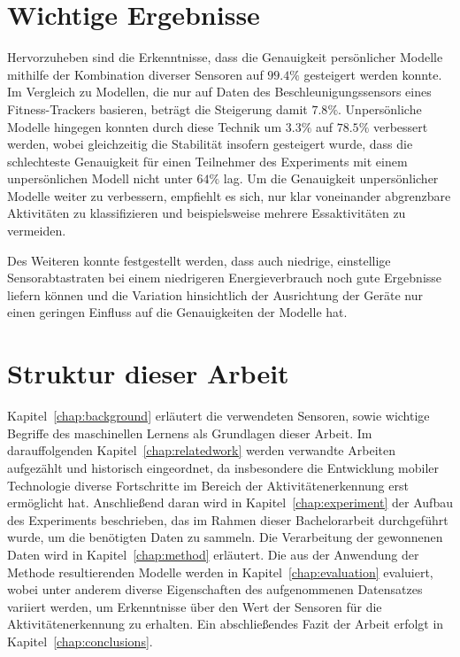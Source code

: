 \section{Wichtige Ergebnisse}
Hervorzuheben sind die Erkenntnisse, dass die Genauigkeit persönlicher Modelle mithilfe der Kombination diverser Sensoren auf $99.4 \%$ gesteigert werden konnte. Im Vergleich zu Modellen, die nur auf Daten des Beschleunigungssensors eines Fitness-Trackers basieren, beträgt die Steigerung damit $7.8 \%$. Unpersönliche Modelle hingegen konnten durch diese Technik um $3.3 \%$ auf $78.5 \%$ verbessert werden, wobei gleichzeitig die Stabilität insofern gesteigert wurde, dass die schlechteste Genauigkeit für einen Teilnehmer des Experiments mit einem unpersönlichen Modell nicht unter $64 \%$ lag. Um die Genauigkeit unpersönlicher Modelle weiter zu verbessern, empfiehlt es sich, nur klar voneinander abgrenzbare Aktivitäten zu klassifizieren und beispielsweise mehrere Essaktivitäten zu vermeiden.

Des Weiteren konnte festgestellt werden, dass auch niedrige, einstellige Sensorabtastraten bei einem niedrigeren Energieverbrauch noch gute Ergebnisse liefern können und die Variation hinsichtlich der Ausrichtung der Geräte nur einen geringen Einfluss auf die Genauigkeiten der Modelle hat.

\section{Struktur dieser Arbeit}
Kapitel~\ref{chap:background} erläutert die verwendeten Sensoren, sowie wichtige Begriffe des maschinellen Lernens als Grundlagen dieser Arbeit. Im darauffolgenden Kapitel~\ref{chap:relatedwork} werden verwandte Arbeiten aufgezählt und historisch eingeordnet, da insbesondere die Entwicklung mobiler Technologie diverse Fortschritte im Bereich der Aktivitätenerkennung erst ermöglicht hat. Anschließend daran wird in Kapitel~\ref{chap:experiment} der Aufbau des Experiments beschrieben, das im Rahmen dieser Bachelorarbeit durchgeführt wurde, um die benötigten Daten zu sammeln. Die Verarbeitung der gewonnenen Daten wird in Kapitel~\ref{chap:method} erläutert. Die aus der Anwendung der Methode resultierenden Modelle werden in Kapitel~\ref{chap:evaluation} evaluiert, wobei unter anderem diverse Eigenschaften des aufgenommenen Datensatzes variiert werden, um Erkenntnisse über den Wert der Sensoren für die Aktivitätenerkennung zu erhalten. Ein abschließendes Fazit der Arbeit erfolgt in Kapitel~\ref{chap:conclusions}.


